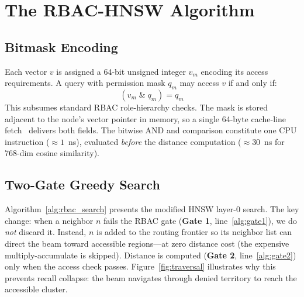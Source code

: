 \section{The RBAC-HNSW Algorithm}
\label{sec:algorithm}

\subsection{Bitmask Encoding}
\label{sec:bitmask}

Each vector $v$ is assigned a 64-bit unsigned integer $v_m$ encoding its
access requirements.
A query with permission mask $q_m$ may access $v$ if and only if:
\[
  (v_m \;\mathbin{\&}\; q_m) = q_m
\]
This subsumes standard RBAC role-hierarchy checks.
The mask is stored adjacent to the node's vector pointer in memory, so a
single 64-byte cache-line fetch~\cite{drepper2007every} delivers both fields.
The bitwise AND and comparison constitute one CPU instruction
(${\approx}1$~ns), evaluated \emph{before} the distance computation
(${\approx}30$~ns for 768-dim cosine similarity).

\subsection{Two-Gate Greedy Search}
\label{sec:search}

Algorithm~\ref{alg:rbac_search} presents the modified HNSW layer-0 search.
The key change: when a neighbor $n$ fails the RBAC gate
(\textbf{Gate 1}, line~\ref{alg:gate1}), we do \emph{not} discard it.
Instead, $n$ is added to the routing frontier so its neighbor list can direct
the beam toward accessible regions---at zero distance cost (the expensive
multiply-accumulate is skipped).
Distance is computed (\textbf{Gate 2}, line~\ref{alg:gate2}) only when the
access check passes.
Figure~\ref{fig:traversal} illustrates why this prevents recall collapse:
the beam navigates through denied territory to reach the accessible cluster.


